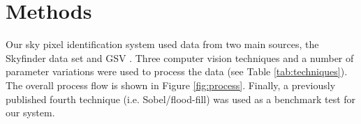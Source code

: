 \documentclass[final,3p,times,authoryear]{elsarticle}
\begin{document}
\section{Methods}\label{sec:Methods}
Our sky pixel identification system used data from two main sources, the Skyfinder data set \citep{Mihail2016} and GSV \citep{GoogleMaps2017b}. Three computer vision techniques and a number of parameter variations were used to process the data (see Table \ref{tab:techniques}). The overall process flow is shown in Figure \ref{fig:process}. Finally, a previously published fourth technique (i.e. Sobel/flood-fill) was used as a benchmark test for our system.







\end{document}
